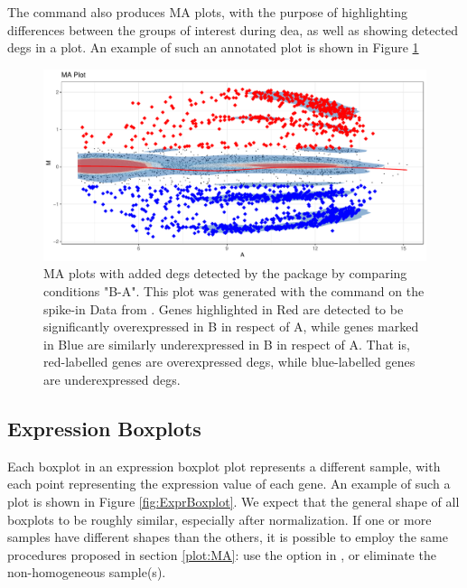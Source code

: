 The  command also produces MA plots, with the purpose of highlighting differences between the groups of interest during \gls{dea}, as well as showing detected \glspl{deg} in a plot. An example of such an annotated plot is shown in Figure \ref{fig:PlatinumMAplotwithDEGs}

\begin{figure}
    \centering
    \includegraphics{resources/images/14_MA-Plot with Limma DEGs B-A.pdf}
    \caption{MA plots with added \glspl{deg} detected by the  package by comparing conditions "B-A". This plot was generated with the  command on the spike-in Data from \textcite{zhuPreferredAnalysisMethods2010}. Genes highlighted in Red are detected to be significantly overexpressed in B in respect of A, while genes marked in Blue are similarly underexpressed in B in respect of A. That is, red-labelled genes are overexpressed \glspl{deg}, while blue-labelled genes are underexpressed \glspl{deg}.}
    \label{fig:PlatinumMAplotwithDEGs}
\end{figure}

\subsection{Expression Boxplots}
\label{plot:exprBox}
Each boxplot in an expression boxplot plot represents a different sample, with each point representing the expression value of each gene. An example of such a plot is shown in Figure \ref{fig:ExprBoxplot}. We expect that the general shape of all boxplots to be roughly similar, especially after normalization. If one or more samples have different shapes than the others, it is possible to employ the same procedures proposed in section \ref{plot:MA}: use the  option in , or eliminate the non-homogeneous sample(s).

